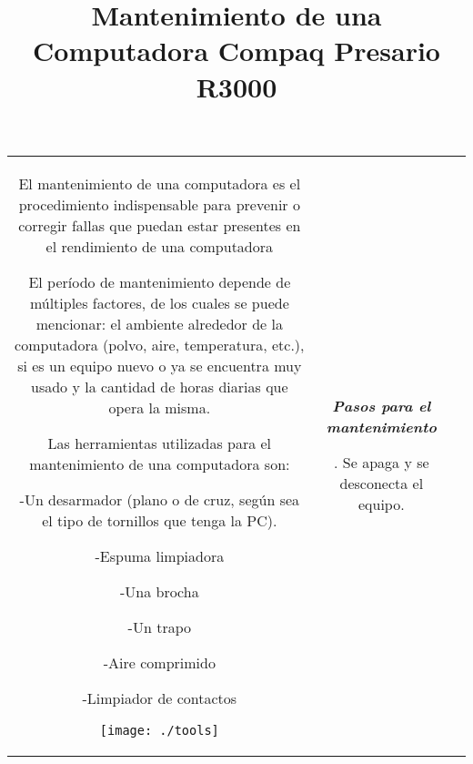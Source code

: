 \documentclass[landscape,12pt]{report}
\begin{document}
\begin{tabular}{c c c}
			\begin{minipage}[t]{8.2cm}
				
				\begin{center}
				\Large \bf
				\title{\textbf{Mantenimiento de una Computadora Compaq Presario R3000}} 
				\end{center}
				
				El mantenimiento de una computadora es el procedimiento indispensable para prevenir o corregir fallas que puedan estar presentes en el rendimiento de una computadora

\medskip 
El per\'iodo de mantenimiento depende de m\'ultiples factores, de los cuales se puede mencionar: el ambiente alrededor de la computadora (polvo, aire, temperatura, etc.), si es un equipo nuevo o ya se encuentra muy usado y la cantidad de horas diarias que opera la misma.

\medskip
Las herramientas utilizadas para el mantenimiento de una computadora son: 

\medskip
-Un desarmador (plano o de cruz, seg\'un sea el tipo de tornillos que tenga la PC). 

-Espuma limpiadora

-Una brocha

-Un trapo

-Aire comprimido

-Limpiador de contactos

\begin{center}
    \texttt{[image: ./tools]}
    \end{center}

\medskip

\medskip
					
				
				
				
			\end{minipage}& 
			\begin{minipage}[t]{8.2cm}				
		
					\begin{center}
					\large
					\bf
					\it
					Pasos para el mantenimiento
					\end{center}
				
				\medskip	
				1. Se apaga y se desconecta el equipo.
				

\end{minipage}
\end{tabular}
\end{document}
